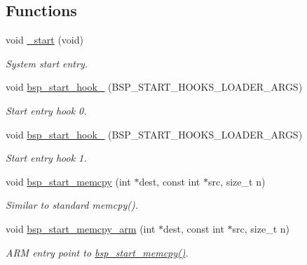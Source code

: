 \subsection*{Functions}
\begin{DoxyCompactItemize}
\item 
\mbox{\label{group__arm__start_ga8b67a6ff3f33fae9b3f1b142005c0bc2}} 
void \mbox{\hyperlink{group__arm__start_ga8b67a6ff3f33fae9b3f1b142005c0bc2}{\+\_\+start}} (void)
\begin{DoxyCompactList}\small\item\em System start entry. \end{DoxyCompactList}\item 
void \mbox{\hyperlink{group__arm__start_ga602d4a8ecc07d3a91dea3ab2c98d9230}{bsp\+\_\+start\+\_\+hook\+\_}} (B\+S\+P\+\_\+\+S\+T\+A\+R\+T\+\_\+\+H\+O\+O\+K\+S\+\_\+\+L\+O\+A\+D\+E\+R\+\_\+\+A\+R\+GS)
\begin{DoxyCompactList}\small\item\em Start entry hook 0. \end{DoxyCompactList}\item 
void \mbox{\hyperlink{group__arm__start_ga24d1f6d59718fe0808feaa76747d82a8}{bsp\+\_\+start\+\_\+hook\+\_}} (B\+S\+P\+\_\+\+S\+T\+A\+R\+T\+\_\+\+H\+O\+O\+K\+S\+\_\+\+L\+O\+A\+D\+E\+R\+\_\+\+A\+R\+GS)
\begin{DoxyCompactList}\small\item\em Start entry hook 1. \end{DoxyCompactList}\item 
void \mbox{\hyperlink{group__arm__start_gaf2f9f23af6ccab93a4f88ce1157107d1}{bsp\+\_\+start\+\_\+memcpy}} (int $\ast$dest, const int $\ast$src, size\+\_\+t n)
\begin{DoxyCompactList}\small\item\em Similar to standard memcpy(). \end{DoxyCompactList}\item 
\mbox{\label{group__arm__start_gae704372fafd47478c85e855ae085749c}} 
void \mbox{\hyperlink{group__arm__start_gae704372fafd47478c85e855ae085749c}{bsp\+\_\+start\+\_\+memcpy\+\_\+arm}} (int $\ast$dest, const int $\ast$src, size\+\_\+t n)
\begin{DoxyCompactList}\small\item\em A\+RM entry point to \mbox{\hyperlink{group__arm__start_gaf2f9f23af6ccab93a4f88ce1157107d1}{bsp\+\_\+start\+\_\+memcpy()}}. \end{DoxyCompactList}\end{DoxyCompactItemize}


